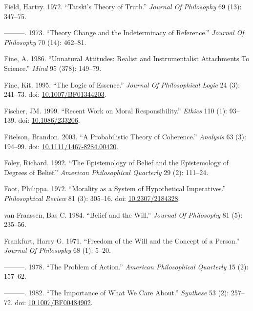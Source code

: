 \documentclass[
  10pt,
  letterpaper,
  DIV=11,
  numbers=noendperiod,
  twoside]{scrartcl}
\newlength{\cslhangindent}
\newenvironment{CSLReferences}[2] %
 {\begin{list}{}{%
  \setlength{\itemindent}{0pt}
  \setlength{\leftmargin}{0pt}
  \setlength{\parsep}{0pt}
  \ifodd #1
   \setlength{\leftmargin}{\cslhangindent}
   \setlength{\itemindent}{-1\cslhangindent}
  \fi
  \setlength{\itemsep}{#2\baselineskip}}}
 {\end{list}}
\begin{document}
\begin{CSLReferences}{1}{0}
Field, Hartry. 1972. {``Tarski's Theory of Truth.''} \emph{Journal Of
Philosophy} 69 (13): 347--75.

---------. 1973. {``Theory Change and the Indeterminacy of Reference.''}
\emph{Journal Of Philosophy} 70 (14): 462--81.

Fine, A. 1986. {``Unnatural Attitudes: Realist and Instrumentalist
Attachments To Science.''} \emph{Mind} 95 (378): 149--79.

Fine, Kit. 1995. {``The Logic of Essence.''} \emph{Journal Of
Philosophical Logic} 24 (3): 241--73. doi:
\href{https://doi.org/10.1007/BF01344203}{10.1007/BF01344203}.

Fischer, JM. 1999. {``Recent Work on Moral Responsibility.''}
\emph{Ethics} 110 (1): 93--139. doi:
\href{https://doi.org/10.1086/233206}{10.1086/233206}.

Fitelson, Brandon. 2003. {``A Probabilistic Theory of Coherence.''}
\emph{Analysis} 63 (3): 194--99. doi:
\href{https://doi.org/10.1111/1467-8284.00420}{10.1111/1467-8284.00420}.

Foley, Richard. 1992. {``The Epistemology of Belief and the Epistemology
of Degrees of Belief.''} \emph{American Philosophical Quarterly} 29 (2):
111--24.

Foot, Philippa. 1972. {``Morality as a System of Hypothetical
Imperatives.''} \emph{Philosophical Review} 81 (3): 305--16. doi:
\href{https://doi.org/10.2307/2184328}{10.2307/2184328}.

van Fraassen, Bas C. 1984. {``Belief and the Will.''} \emph{Journal Of
Philosophy} 81 (5): 235--56.

Frankfurt, Harry G. 1971. {``Freedom of the Will and the Concept of a
Person.''} \emph{Journal Of Philosophy} 68 (1): 5--20.

---------. 1978. {``The Problem of Action.''} \emph{American
Philosophical Quarterly} 15 (2): 157--62.

---------. 1982. {``The Importance of What We Care About.''}
\emph{Synthese} 53 (2): 257--72. doi:
\href{https://doi.org/10.1007/BF00484902}{10.1007/BF00484902}.


\end{CSLReferences}
\end{document}
